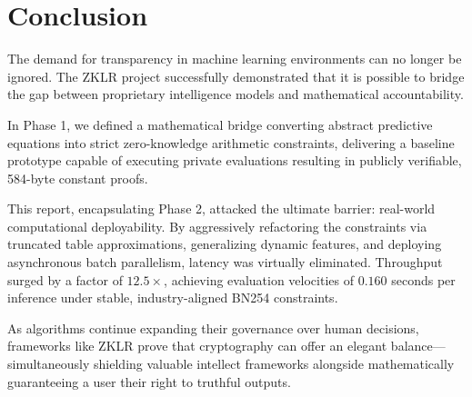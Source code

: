 \chapter{Conclusion}

The demand for transparency in machine learning environments can no longer be ignored. The ZKLR project successfully demonstrated that it is possible to bridge the gap between proprietary intelligence models and mathematical accountability.

In Phase 1, we defined a mathematical bridge converting abstract predictive equations into strict zero-knowledge arithmetic constraints, delivering a baseline prototype capable of executing private evaluations resulting in publicly verifiable, 584-byte constant proofs.

This report, encapsulating Phase 2, attacked the ultimate barrier: real-world computational deployability. By aggressively refactoring the constraints via truncated table approximations, generalizing dynamic features, and deploying asynchronous batch parallelism, latency was virtually eliminated. Throughput surged by a factor of $12.5\times$, achieving evaluation velocities of $0.160$ seconds per inference under stable, industry-aligned BN254 constraints.

As algorithms continue expanding their governance over human decisions, frameworks like ZKLR prove that cryptography can offer an elegant balance—simultaneously shielding valuable intellect frameworks alongside mathematically guaranteeing a user their right to truthful outputs.

